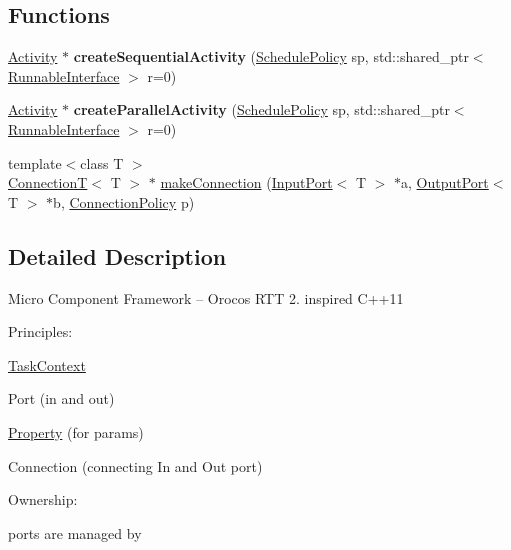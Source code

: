\subsection*{Functions}
\begin{DoxyCompactItemize}
\item 
\hypertarget{namespacecoco_a42f5b31ac6886c63c9dfc27cccb4b2a1}{\hyperlink{classcoco_1_1_activity}{Activity} $\ast$ {\bfseries create\-Sequential\-Activity} (\hyperlink{structcoco_1_1_schedule_policy}{Schedule\-Policy} sp, std\-::shared\-\_\-ptr$<$ \hyperlink{classcoco_1_1_runnable_interface}{Runnable\-Interface} $>$ r=0)}\label{namespacecoco_a42f5b31ac6886c63c9dfc27cccb4b2a1}

\item 
\hypertarget{namespacecoco_a9149c0ad2cb2e734ba6309847ed07774}{\hyperlink{classcoco_1_1_activity}{Activity} $\ast$ {\bfseries create\-Parallel\-Activity} (\hyperlink{structcoco_1_1_schedule_policy}{Schedule\-Policy} sp, std\-::shared\-\_\-ptr$<$ \hyperlink{classcoco_1_1_runnable_interface}{Runnable\-Interface} $>$ r=0)}\label{namespacecoco_a9149c0ad2cb2e734ba6309847ed07774}

\item 
{\footnotesize template$<$class T $>$ }\\\hyperlink{classcoco_1_1_connection_t}{Connection\-T}$<$ T $>$ $\ast$ \hyperlink{namespacecoco_ab1c6f801a96a052233ae28fbe34b7fe3}{make\-Connection} (\hyperlink{classcoco_1_1_input_port}{Input\-Port}$<$ T $>$ $\ast$a, \hyperlink{classcoco_1_1_output_port}{Output\-Port}$<$ T $>$ $\ast$b, \hyperlink{structcoco_1_1_connection_policy}{Connection\-Policy} p)
\end{DoxyCompactItemize}


\subsection{Detailed Description}
Micro Component Framework -- Orocos R\-T\-T 2. inspired C++11

Principles\-:
\begin{DoxyItemize}
\item \hyperlink{classcoco_1_1_task_context}{Task\-Context}
\item Port (in and out)
\item \hyperlink{classcoco_1_1_property}{Property} (for params)
\item Connection (connecting In and Out port)
\end{DoxyItemize}

Ownership\-:
\begin{DoxyItemize}
\item ports are managed by
\end{DoxyItemize}

